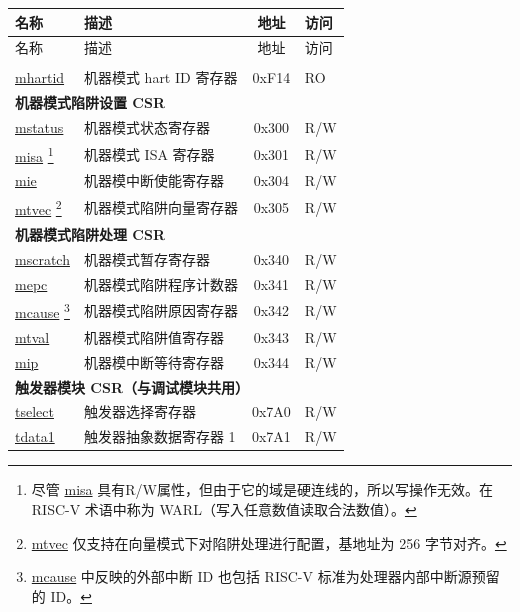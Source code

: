 \begin{longtable}{ | p{4.0cm} | p{8.4cm} | c | l | }
\hline\rowcolor{lightgray}
名称 & 描述 & 地址 & 访问 \\ \hline
\endfirsthead
\hline
\rowcolor{lightgray}
名称 & 描述 & 地址 & 访问 \\
\hline
\endhead
\endfoot

\multicolumn{4}{|l|}{\textbf{机器模式信息 CSR}} \\\hline
\hyperref[regdesc:LPMHARTID]{mhartid} & 机器模式 hart ID 寄存器 & 0xF14 & RO \\\hline
\multicolumn{4}{|l|}{\textbf{机器模式陷阱设置 CSR}} \\\hline
\hyperref[regdesc:LPMSTATUS]{mstatus} & 机器模式状态寄存器 & 0x300 & R/W \\\hline
\hyperref[regdesc:LPMISA]{misa} \footnote{尽管 \hyperref[regdesc:LPMISA]{misa} 具有R/W属性，但由于它的域是硬连线的，所以写操作无效。在 RISC-V 术语中称为 WARL（写入任意数值读取合法数值）。} & 机器模式 ISA 寄存器 & 0x301 & R/W \\\hline
\hyperref[regdesc:LPMIE]{mie} & 机器模中断使能寄存器 & 0x304 & R/W \\\hline
\hyperref[regdesc:LPMTVEC]{mtvec} \footnote{\hyperref[regdesc:LPMTVEC]{mtvec} 仅支持在向量模式下对陷阱处理进行配置，基地址为 256 字节对齐。} & 机器模式陷阱向量寄存器 & 0x305 & R/W \\\hline
\multicolumn{4}{|l|}{\textbf{机器模式陷阱处理 CSR}} \\\hline
\hyperref[regdesc:LPMSCRATCH]{mscratch} & 机器模式暂存寄存器 & 0x340 & R/W \\\hline
\hyperref[regdesc:LPMEPC]{mepc} & 机器模式陷阱程序计数器 & 0x341 & R/W \\\hline
\hyperref[regdesc:LPMCAUSE]{mcause} \footnote{\hyperref[regdesc:LPMCAUSE]{mcause} 中反映的外部中断 ID 也包括 RISC-V 标准为处理器内部中断源预留的 ID。} & 机器模式陷阱原因寄存器 & 0x342 & R/W \\\hline
\hyperref[regdesc:LPMTVAL]{mtval} & 机器模式陷阱值寄存器 & 0x343 & R/W \\\hline
\hyperref[regdesc:LPMIP]{mip} & 机器模中断等待寄存器 & 0x344 & R/W \\\hline
\multicolumn{4}{|l|}{\textbf{触发器模块 CSR（与调试模块共用）}} \\\hline
\hyperref[regdesc:LPTSELECT]{tselect} & 触发器选择寄存器 & 0x7A0 & R/W \\\hline
\hyperref[regdesc:LPTDATA1]{tdata1} & 触发器抽象数据寄存器 1  & 0x7A1 & R/W \\\hline

\end{longtable}
